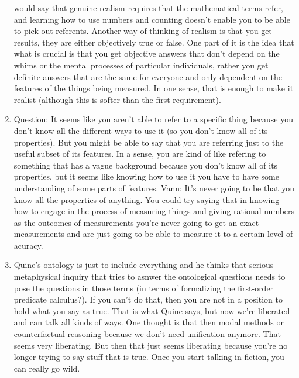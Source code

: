 \documentclass[12pt]{article}
\theoremstyle{definition}
\begin{document}
\begin{enumerate}
        would say that genuine realism requires that the mathematical terms
        refer, and learning how to use numbers and counting doesn't enable you
        to be able to pick out referents. Another way of thinking of realism is
        that you get results, they are either objectively true or false. One
        part of it is the idea that what is crucial is that you get objective
        answers that don't depend on the whims or the mental processes of
        particular individuals, rather you get definite answers that are the
        same for everyone and only dependent on the features of the things
        being measured. In one sense, that is enough to make it realist
        (although this is softer than the first requirement).
    \item
        Question: It seems like you aren't able to refer to a specific thing because you
        don't know all the different ways to use it (so you don't know all of
        its properties). But you might be able to say that you are referring
        just to the useful subset of its features. In a sense, you are kind of
        like refering to something that has a vague background because you
        don't know all of its properties, but it seems like knowing how to use
        it you have to have some understanding of some parts of features. Vann:
        It's never going to be that you know all the properties of anything.
        You could try saying that in knowing how to engage in the process of
        measuring things and giving rational numbers as the outcomes of
        measurements you're never going to get an exact measurements and are
        just going to be able to measure it to a certain level of acuracy.
    \item
        Quine's ontology is just to include everything and he thinks that
        serious metaphysical inquiry that tries to asnwer the ontological
        questions needs to pose the questions in those terms (in terms of
        formalizing the first-order predicate calculus?). If you can't do that,
        then you are not in a position to hold what you say as true. That is
        what Quine says, but now we're liberated and can talk all kinds of
        ways. One thought is that then  modal methods or counterfactual
        reasoning because we don't need unification anymore. That seems very
        liberating. But then that just seems liberating because you're no
        longer trying to say stuff that is true. Once you start talking in
        fiction, you can really go wild.
\end{enumerate}
\end{document}
